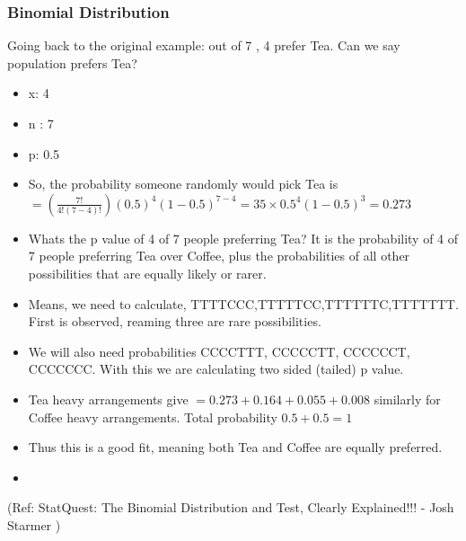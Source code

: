\begin{frame}[fragile]\frametitle{Binomial Distribution}
Going back to the original example: out of 7 , 4 prefer Tea. Can we say population prefers Tea?


	\begin{itemize}
	\item x: 4
	\item n : 7
	\item p: 0.5
	\item So, the probability someone randomly would pick Tea is $= (\frac{7!}{4!(7-4)!})(0.5)^4(1-0.5)^{7-4} = 35 \times 0.5^4(1-0.5)^3 = 0.273$
	\item Whats the p value of 4 of 7 people preferring Tea? It is the probability of 4 of 7 people preferring Tea over Coffee, plus the probabilities of all other possibilities that are equally likely or rarer.
	\item Means, we need to calculate, TTTTCCC,TTTTTCC,TTTTTTC,TTTTTTT. First is observed, reaming three are rare possibilities.
	\item We will also need probabilities CCCCTTT, CCCCCTT, CCCCCCT, CCCCCCC. With this we are calculating two sided (tailed) p value.
	\item Tea heavy arrangements give $= 0.273 + 0.164 + 0.055 + 0.008$ similarly for Coffee heavy arrangements. Total probability $0.5 + 0.5 = 1$
	\item Thus this is a good fit, meaning both Tea and Coffee are equally preferred.
	\item 
	\end{itemize}

 
\tiny{(Ref: StatQuest: The Binomial Distribution and Test, Clearly Explained!!! - Josh Starmer )}
\end{frame}



